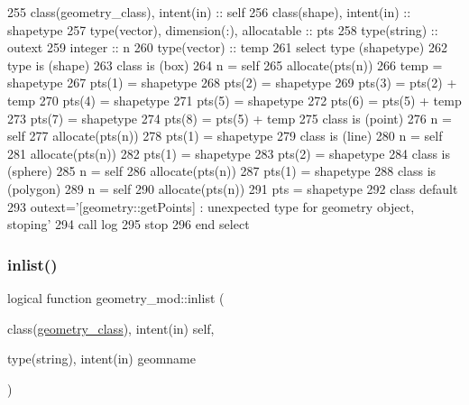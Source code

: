 \begin{DoxyCode}
255     \textcolor{keywordtype}{class}(geometry\_class), \textcolor{keywordtype}{intent(in)} :: self
256     \textcolor{keywordtype}{class}(shape), \textcolor{keywordtype}{intent(in)} :: shapetype
257     \textcolor{keywordtype}{type}(vector), \textcolor{keywordtype}{dimension(:)}, \textcolor{keywordtype}{allocatable} :: pts
258     \textcolor{keywordtype}{type}(string) :: outext
259     \textcolor{keywordtype}{integer} :: n
260     \textcolor{keywordtype}{type}(vector) :: temp
261     \textcolor{keywordflow}{select type} (shapetype)
262 \textcolor{keywordflow}{    type is} (shape)
263 \textcolor{keywordflow}{    class is} (box)
264         n = self%
265         \textcolor{keyword}{allocate}(pts(n))
266         temp = shapetype%
267         pts(1) = shapetype%
268         pts(2) = shapetype%
269         pts(3) = pts(2) + temp%
270         pts(4) = shapetype%
271         pts(5) = shapetype%
272         pts(6) = pts(5) + temp%
273         pts(7) = shapetype%
274         pts(8) = pts(5) + temp%
275 \textcolor{keywordflow}{    class is} (point)
276         n = self%
277         \textcolor{keyword}{allocate}(pts(n))
278         pts(1) = shapetype%
279 \textcolor{keywordflow}{    class is} (line)
280         n = self%
281         \textcolor{keyword}{allocate}(pts(n))
282         pts(1) = shapetype%
283         pts(2) = shapetype%
284 \textcolor{keywordflow}{    class is} (sphere)
285         n = self%
286         \textcolor{keyword}{allocate}(pts(n))
287         pts(1) = shapetype%
288 \textcolor{keywordflow}{    class is} (polygon)
289         n = self%
290         \textcolor{keyword}{allocate}(pts(n))
291         pts = shapetype%
292 \textcolor{keywordflow}{        class default}
293         outext=\textcolor{stringliteral}{'[geometry::getPoints] : unexpected type for geometry object, stoping'}
294         \textcolor{keyword}{call }log%
295         stop
296 \textcolor{keywordflow}{    end select}
\end{DoxyCode}
\mbox{\label{namespacegeometry__mod_a22dd77024fce56da299445a697256155}} 
\subsubsection{\texorpdfstring{inlist()}{inlist()}}
{\footnotesize\ttfamily logical function geometry\+\_\+mod\+::inlist (\begin{DoxyParamCaption}\item[{class(\mbox{\hyperlink{structgeometry__mod_1_1geometry__class}{geometry\+\_\+class}}), intent(in)}]{self,  }\item[{type(string), intent(in)}]{geomname }\end{DoxyParamCaption})\hspace{0.3cm}{\ttfamily [private]}}



